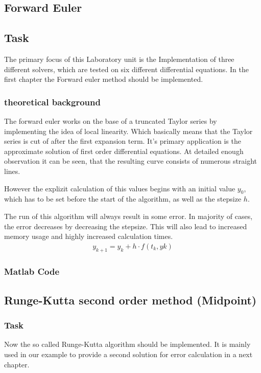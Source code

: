 \subsection{Forward Euler}
\subsection{Task}
The primary focus of this Laboratory unit is the Implementation of three different solvers, which are tested on six different differential equations. In the first chapter the Forward euler method should be implemented. 
\subsubsection{theoretical background}
The forward euler works on the base of a truncated Taylor series by implementing the idea of local linearity. Which basically means that the Taylor series is cut of after the first expansion term. It's primary application is the approximate solution of first order differential equations. At detailed enough observation it can be seen, that the resulting curve consists of numerous straight lines.

However the explizit calculation of this values begins with an initial value $y_0$, which has to be set before the start of the algorithm, as well as the stepsize $h$.

The run of this algorithm will always result in some error. In majority of cases, the error decreases by decreasing the stepsize. This will also lead to increased memory usage and highly increased calculation times.
\begin{align}
    y_{k+1}=y_k+h\cdot f(t_k, yk)
\end{align}
\subsubsection{Matlab Code}


\subsection{Runge-Kutta second order method (Midpoint)}
\subsubsection{Task}
Now the so called Runge-Kutta algorithm should be implemented. It is mainly used in our example to provide a second solution for error calculation in a next chapter.

